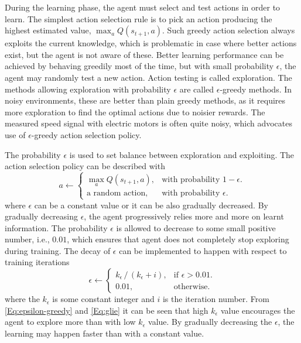 
During the learning phase, the agent must select and test actions in order to learn. The simplest action selection rule is to pick an action producing the highest estimated value, $\max_{a}Q(s_{t+1}, a)$. Such greedy action selection always exploits the current knowledge, which is problematic in case where better actions exist, but the agent is not aware of these. Better learning performance can be achieved by behaving greedily most of the time, but with small probability $\epsilon$, the agent may randomly test a new action. Action testing is called exploration. The methods allowing exploration with probability $\epsilon$ are called $\epsilon$-greedy methods. In noisy environments, these are better than plain greedy methods, as it requires more exploration to find the optimal actions due to noisier rewards. The measured speed signal with electric motors is often quite noisy, which advocates use of $\epsilon$-greedy action selection policy. \cite{RL:Sutton-Barto}

The probability $\epsilon$ is used to set balance between exploration and exploiting. The action selection policy can be described with \cite{RL:Sutton-Barto}
\begin{equation}
  a \leftarrow \begin{cases}
    \max_{a}Q(s_{t+1}, a),  & \text{with probability $1 - \epsilon$}.\\
    \text{a random action}, & \text{with probability $\epsilon$}.
  \end{cases}
  \label{Eq:epsilon-greedy}
\end{equation}
where $\epsilon$ can be a constant value or it can be also gradually decreased. By gradually decreasing $\epsilon$, the agent progressively relies more and more on learnt information. The probability $\epsilon$ is allowed to decrease to some small positive number, i.e., $0.01$, which ensures that agent does not completely stop exploring during training. The decay of $\epsilon$ can be implemented to happen with respect to training iterations
\begin{equation}
  \epsilon \leftarrow \begin{cases}
    k_\epsilon \,/\,(k_\epsilon + i), & \text{if $\epsilon > 0.01$}.\\
    0.01,        & \text{otherwise}.
  \end{cases}
  \label{Eq:glie}
\end{equation}
where the $k_\epsilon$ is some constant integer and $i$ is the iteration number. From \eqref{Eq:epsilon-greedy} and \eqref{Eq:glie} it can be seen that high $k_\epsilon$ value encourages the agent to explore more than with low $k_\epsilon$ value. By gradually decreasing the $\epsilon$, the learning may happen faster than with a constant value.

